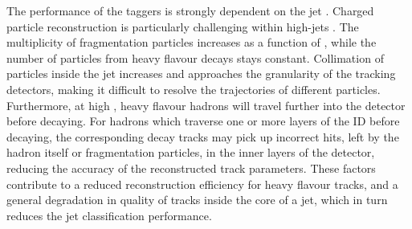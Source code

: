 The performance of the taggers is strongly dependent on the jet \pt.
Charged particle reconstruction is particularly challenging within high-\pt jets \cite{PERF-2015-08}.
The multiplicity of fragmentation particles increases as a function of \pt, while the number of particles from heavy flavour decays stays constant.
Collimation of particles inside the jet increases and approaches the granularity of the tracking detectors, making it difficult to resolve the trajectories of different particles.
Furthermore, at high \pt, heavy flavour hadrons will travel further into the detector before decaying.
For hadrons which traverse one or more layers of the ID before decaying, the corresponding decay tracks may pick up incorrect hits, left by the hadron itself or fragmentation particles, in the inner layers of the detector, reducing the accuracy of the reconstructed track parameters.
These factors contribute to a reduced reconstruction efficiency for heavy flavour tracks, and a general degradation in quality of tracks inside the core of a jet, which in turn reduces the jet classification performance.


